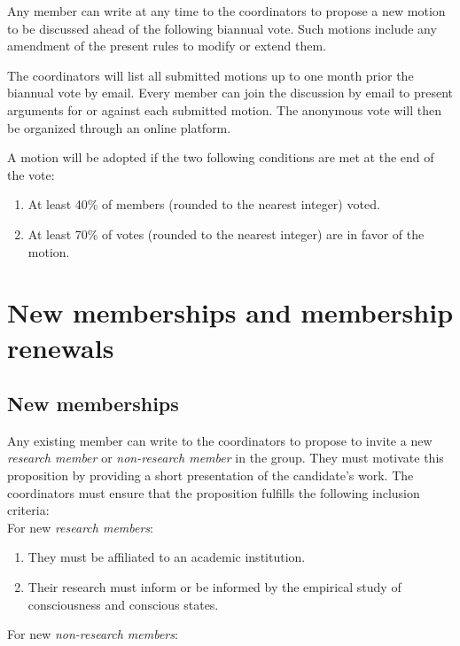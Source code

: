 \documentclass[a4paper, 11pt]{scrartcl}
\begin{document}
Any member can write at any time to the coordinators to propose a new motion to be discussed ahead of the following biannual vote. Such motions include any amendment of the present rules to modify or extend them. 

The coordinators will list all submitted motions up to one month prior the biannual vote by email. Every member can join the discussion by email to present arguments for or against each submitted motion. The anonymous vote will then be organized through an online platform. 

A motion will be adopted if the two following conditions are met at the end of the vote:

\begin{enumerate}
\item At least 40\% of members (rounded to the nearest integer) voted.
\item At least 70\% of votes (rounded to the nearest integer) are in favor of the motion.
\end{enumerate} 

\section{New memberships and membership renewals}

\subsection{New memberships}
\label{new_memberships}

Any existing member can write to the coordinators to propose to invite a new \emph{research member} or \emph{non-research member} in the group. They must motivate this proposition by providing a short presentation of the candidate's work. The coordinators must ensure that the proposition fulfills the following inclusion criteria: \\

For new \emph{research members}:

\begin{enumerate}
\item They must be affiliated to an academic institution. 
\item Their research must inform or be informed by the empirical study of consciousness and conscious states. 

\end{enumerate}


For new \emph{non-research members}:   
\end{document}
